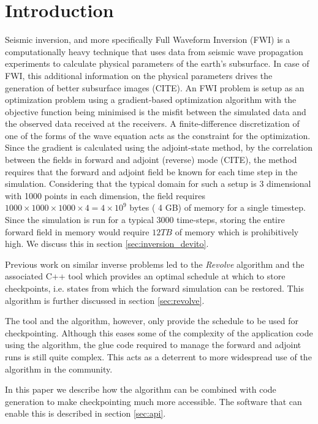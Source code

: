 \documentclass[sigconf]{acmart}
\begin{document}
\section{Introduction}
Seismic inversion, and more specifically Full Waveform Inversion (FWI)
is a computationally heavy technique that uses data from seismic wave
propagation experiments to calculate physical parameters of the
earth's subsurface. In case of FWI, this additional information on the
physical parameters drives the generation of better subsurface
images (CITE). An FWI problem is setup as an optimization problem using
a gradient-based optimization algorithm with the objective function
being minimised is the misfit between the simulated data and the
observed data received at the receivers. A finite-difference
discretization of one of the forms of the wave equation acts as the
constraint for the optimization. Since the gradient is calculated using the
adjoint-state method, by the correlation between the fields in forward
and adjoint (reverse) mode (CITE), the method requires that the forward and
adjoint field be known for each time step in the
simulation. Considering that the typical domain for such a setup is 3
dimensional with 1000 points in each dimension, the field requires
$1000 \times 1000 \times 1000 \times 4 = 4 \times 10^{9} $ bytes ( 4
GB) of memory for a single timestep. Since the simulation is run for a
typical $3000$ time-steps, storing the entire forward field in memory
would require $12 TB$ of memory which is prohibitively high. We
discuss this in section \ref{sec:inversion_devito}. 

Previous work on similar inverse problems led to the \emph{Revolve}
algorithm \cite{griewank2000} and the associated C++ tool which
provides an optimal schedule at which to store checkpoints,
i.e. states from which the forward simulation can be restored. This
algorithm is further discussed in section \ref{sec:revolve}.

The tool and the algorithm, however, only provide the schedule to be
used for checkpointing. Although this eases some of the complexity of
the application code using the algorithm, the glue code required to
manage the forward and adjoint runs is still quite complex. This acts
as a deterrent to more widespread use of the algorithm in the
community. 

In this paper we describe how the algorithm can be combined with code
generation to make checkpointing much more accessible. The software that
can enable this is described in section \ref{sec:api}. 
\end{document}
